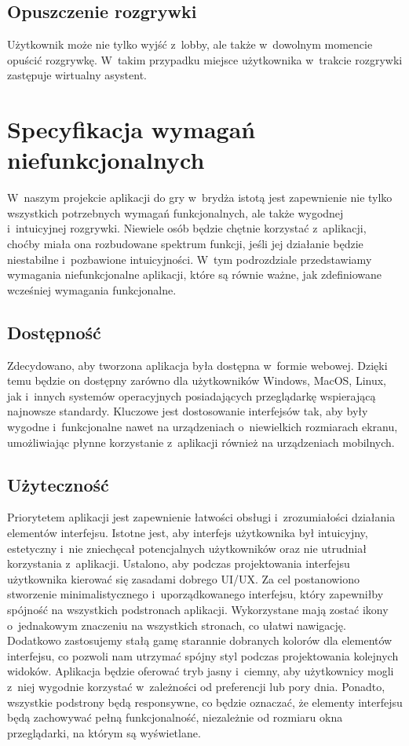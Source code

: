 \subsection{Opuszczenie rozgrywki}
Użytkownik może nie tylko wyjść z~lobby, ale także w~dowolnym momencie
opuścić rozgrywkę. W~takim przypadku miejsce użytkownika w~trakcie
rozgrywki zastępuje wirtualny asystent.




\section{Specyfikacja wymagań niefunkcjonalnych}
W~naszym projekcie aplikacji do gry w~brydża
istotą jest zapewnienie nie tylko wszystkich potrzebnych wymagań
funkcjonalnych, ale także wygodnej i~intuicyjnej rozgrywki. Niewiele osób
będzie chętnie korzystać z~aplikacji, choćby miała ona rozbudowane
spektrum funkcji, jeśli jej działanie będzie niestabilne i~pozbawione
intuicyjności. W~tym podrozdziale przedstawiamy wymagania
niefunkcjonalne aplikacji, które są równie ważne, jak zdefiniowane
wcześniej wymagania funkcjonalne.


\subsection{Dostępność}
Zdecydowano, aby tworzona aplikacja była dostępna w~formie webowej.
Dzięki temu będzie on dostępny zarówno dla użytkowników
Windows, MacOS, Linux, jak i~innych systemów operacyjnych posiadających
przeglądarkę wspierającą najnowsze standardy.
Kluczowe jest dostosowanie interfejsów tak,
aby były wygodne i~funkcjonalne nawet na urządzeniach o~niewielkich
rozmiarach ekranu, umożliwiając płynne korzystanie z~aplikacji również
na urządzeniach mobilnych.


\subsection{Użyteczność}
Priorytetem aplikacji jest zapewnienie łatwości obsługi
i~zrozumiałości działania elementów interfejsu.
Istotne jest, aby interfejs użytkownika
był intuicyjny, estetyczny i~nie zniechęcał potencjalnych użytkowników
oraz nie utrudniał korzystania z~aplikacji. Ustalono, aby podczas
projektowania interfejsu użytkownika kierować się zasadami
dobrego UI/UX.
Za cel postanowiono stworzenie minimalistycznego i~uporządkowanego
interfejsu, który zapewniłby spójność na wszystkich podstronach aplikacji.
Wykorzystane mają zostać ikony o~jednakowym znaczeniu na wszystkich stronach,
co ułatwi nawigację. Dodatkowo zastosujemy stałą gamę starannie
dobranych kolorów dla elementów interfejsu, co pozwoli nam utrzymać
spójny styl podczas projektowania kolejnych widoków. Aplikacja
będzie oferować tryb jasny i~ciemny, aby użytkownicy mogli z~niej
wygodnie korzystać w~zależności od preferencji lub pory dnia.
Ponadto, wszystkie podstrony będą responsywne, co będzie oznaczać,
że elementy interfejsu będą zachowywać pełną funkcjonalność,
niezależnie od rozmiaru okna przeglądarki, na którym są wyświetlane.


